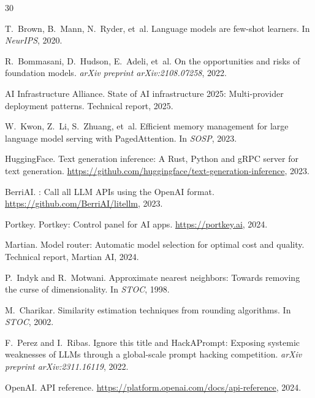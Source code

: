 
\begin{thebibliography}{30}

T.~Brown, B.~Mann, N.~Ryder, et~al.
\newblock Language models are few-shot learners.
\newblock In \emph{NeurIPS}, 2020.

R.~Bommasani, D.~Hudson, E.~Adeli, et~al.
\newblock On the opportunities and risks of foundation models.
\newblock \emph{arXiv preprint arXiv:2108.07258}, 2022.

AI Infrastructure Alliance.
\newblock State of AI infrastructure 2025: Multi-provider deployment patterns.
\newblock Technical report, 2025.

W.~Kwon, Z.~Li, S.~Zhuang, et~al.
\newblock Efficient memory management for large language model serving with {PagedAttention}.
\newblock In \emph{SOSP}, 2023.

HuggingFace.
\newblock Text generation inference: A {Rust}, {Python} and {gRPC} server for text generation.
\newblock \url{https://github.com/huggingface/text-generation-inference}, 2023.

BerriAI.
: Call all {LLM} {APIs} using the {OpenAI} format.
\newblock \url{https://github.com/BerriAI/litellm}, 2023.

Portkey.
\newblock Portkey: Control panel for {AI} apps.
\newblock \url{https://portkey.ai}, 2024.

Martian.
\newblock Model router: Automatic model selection for optimal cost and quality.
\newblock Technical report, Martian AI, 2024.

P.~Indyk and R.~Motwani.
\newblock Approximate nearest neighbors: Towards removing the curse of dimensionality.
\newblock In \emph{STOC}, 1998.

M.~Charikar.
\newblock Similarity estimation techniques from rounding algorithms.
\newblock In \emph{STOC}, 2002.

F.~Perez and I.~Ribas.
\newblock Ignore this title and {HackAPrompt}: Exposing systemic weaknesses of {LLMs} through a global-scale prompt hacking competition.
\newblock \emph{arXiv preprint arXiv:2311.16119}, 2022.

OpenAI.
 {API} reference.
\newblock \url{https://platform.openai.com/docs/api-reference}, 2024.


\end{thebibliography}
